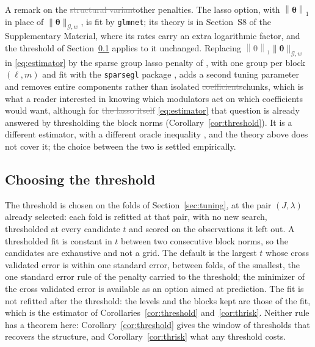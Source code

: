 \documentclass[12pt]{article} %
\theoremstyle{definition}
\theoremstyle{plain}
\newcommand{\norm}[1]{\left\lVert #1 \right\rVert}
\newcommand{\cv}{\ell}
\newcommand{\md}{m}
\newcommand{\btheta}{\boldsymbol{\theta}}
\newcommand{\pen}{\lambda}
\newcommand{\nGw}[1]{\lVert #1\rVert_{\mathcal{G},w}}
\begin{document}
A remark on the \textcolor{gray}{\sout{structural variant}}\textcolor{colR1}{other penalties}. \textcolor{colR1}{The lasso option, with
$\norm{\btheta}_1$ in place of $\nGw{\btheta}$, is fit by \texttt{glmnet}; its
theory is in Section~S8 of the Supplementary Material, where its rates carry
an extra logarithmic factor, and the threshold of Section~\ref{sec:threshold}
applies to it unchanged.} Replacing \textcolor{gray}{\sout{$\norm{\btheta}_1$}}\textcolor{colR1}{$\nGw{\btheta}$} in
\eqref{eq:estimator} by the sparse group lasso penalty of
\citet{Simon-Friedman-Hastie-Tibshirani-2013}, with one group per block
$(\cv,\md)$ \textcolor{colR1}{and fit with the \texttt{sparsegl} package
\citep{Liang-Cohen-SolonHeinsfeld-Pestilli-McDonald-2024}}, adds a second tuning parameter and removes entire components
rather than isolated \textcolor{gray}{\sout{coefficients}}\textcolor{colR1}{chunks}, which is what a reader interested in
knowing which modulators act on which coefficients would want\textcolor{colR1}{, although for}
\textcolor{gray}{\sout{the lasso itself}} \textcolor{colR1}{\eqref{eq:estimator}} \textcolor{colR1}{that question is already answered by thresholding the block
norms (Corollary~\ref{cor:threshold})}. It is a
different estimator, with a different oracle inequality
\citep{Lounici-Pontil-vandeGeer-Tsybakov-2011}, and the theory above does not
cover it; the choice between the two is settled empirically.

{\color{colR1}
\subsection{Choosing the threshold}
\label{sec:threshold}

The threshold is chosen on the folds of Section~\ref{sec:tuning}, at the pair
$(J,\pen)$ already selected: each fold is refitted at that pair, with no new
search, thresholded at every candidate $t$ and scored on the observations it
left out. A thresholded fit is constant in $t$ between two consecutive block
norms, so the candidates are exhaustive and not a grid. The default is the
largest $t$ whose cross validated error is within one standard error, between
folds, of the smallest, the one standard error rule of the penalty carried to
the threshold; the minimizer of the cross validated error is available as an
option aimed at prediction. The fit is not refitted after the threshold: the
levels and the blocks kept are those of the fit, which is the estimator of
Corollaries~\ref{cor:threshold} and~\ref{cor:thrisk}. Neither rule has a
theorem here: Corollary~\ref{cor:threshold} gives the window of thresholds
that recovers the structure, and Corollary~\ref{cor:thrisk} what any threshold
costs.
}
\end{document}
